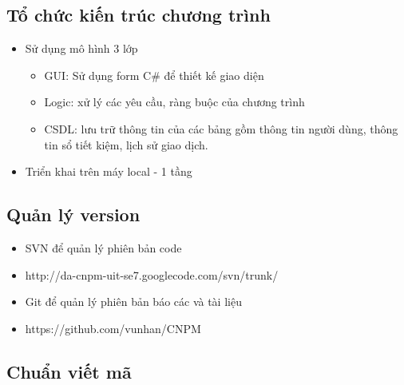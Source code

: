 \documentclass{article}
\begin{document}
			\subsection{Tổ chức kiến trúc chương trình}
			
				\begin{itemize}
					\item Sử dụng mô hình 3 lớp
					
						\begin{itemize}
							\item GUI: Sử dụng form C\# để thiết kế giao diện
							\item Logic: xử lý các yêu cầu, ràng buộc của chương trình
							\item CSDL: lưu trữ thông tin của các bảng gồm thông tin người dùng, thông tin sổ tiết kiệm, lịch sử giao dịch.
						\end{itemize}
					
					\item Triển khai trên máy local - 1 tầng
				\end{itemize}
			
			\subsection{Quản lý version}
			
				\begin{itemize}
					\item SVN để quản lý phiên bản code
					\item http://da-cnpm-uit-se7.googlecode.com/svn/trunk/
					\item Git để quản lý phiên bản báo các và tài liệu
					\item https://github.com/vunhan/CNPM
				\end{itemize}
			
			\subsection{Chuẩn viết mã}
			
\end{document}
